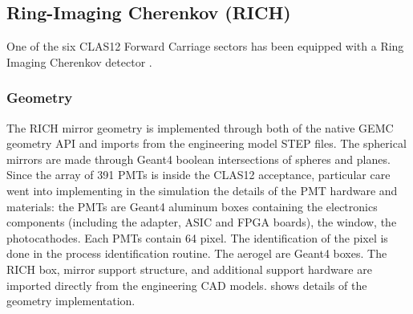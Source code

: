 \subsection{Ring-Imaging Cherenkov (RICH)}

One of the six CLAS12 Forward Carriage sectors has been equipped with a Ring Imaging Cherenkov detector \cite{rich-nim}.

\subsubsection{Geometry}
The RICH mirror geometry is implemented through both of the native GEMC geometry API and imports from the engineering model STEP files.
The spherical mirrors are made through Geant4 boolean intersections of spheres and planes.
Since the array of 391 PMTs is inside the CLAS12 acceptance, particular care went into implementing in the
simulation the details of the PMT hardware and materials: the PMTs are Geant4 aluminum boxes containing the electronics components
(including the adapter, ASIC and FPGA boards), the window, the photocathodes.
Each PMTs contain 64 pixel. The identification of the pixel is done in the process identification routine.
The aerogel are Geant4 boxes.
The RICH box, mirror support structure, and additional support hardware are imported directly from the engineering CAD models.
 shows details of the geometry implementation.

